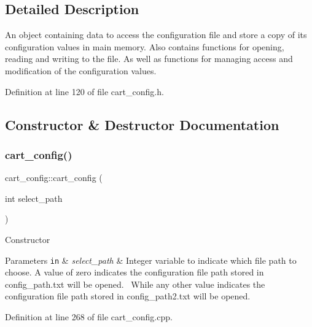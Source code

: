 \subsection{Detailed Description}
An object containing data to access the configuration file and store a copy of its configuration values in main memory. Also contains functions for opening, reading and writing to the file. As well as functions for managing access and modification of the configuration values. 

Definition at line 120 of file cart\+\_\+config.\+h.



\subsection{Constructor \& Destructor Documentation}
\mbox{\label{classcart__config_a080069ffff0306121fc494e37b05fdd7}} 
\subsubsection{\texorpdfstring{cart\+\_\+config()}{cart\_config()}}
{\footnotesize\ttfamily cart\+\_\+config\+::cart\+\_\+config (\begin{DoxyParamCaption}\item[{int}]{select\+\_\+path }\end{DoxyParamCaption})}

Constructor 
\begin{DoxyParams}[1]{Parameters}
\mbox{\tt in}  & {\em select\+\_\+path} & Integer variable to indicate which file path to choose. A value of zero indicates the configuration file path stored in config\+\_\+path.\+txt will be opened.~\newline
 While any other value indicates the configuration file path stored in config\+\_\+path2.\+txt will be opened. \\
\hline
\end{DoxyParams}


Definition at line 268 of file cart\+\_\+config.\+cpp.

\mbox{\label{classcart__config_ae9aafdb5141c1e8851700c72d083fc9b}} 
